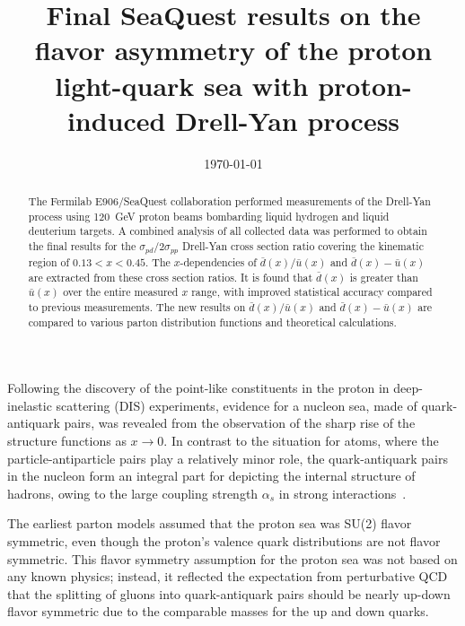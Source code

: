 \documentclass[reprint,aps,unsortedaddress,superscriptaddress,prl,floatfix,showpacs,linenumbers]{revtex4-2}
\begin{document}
\title{Final SeaQuest results on the flavor asymmetry of the proton light-quark sea with proton-induced Drell-Yan process}


\date{\today}

\begin{abstract}
    The Fermilab E906/SeaQuest collaboration performed measurements of the Drell-Yan process using
    \SI{120}{\GeV} proton beams bombarding liquid hydrogen and liquid deuterium targets.
    A combined analysis of all collected data was performed to obtain the final results for the $\sigma_{pd}/2\sigma_{pp}$ Drell-Yan cross
    section ratio covering the kinematic region of $0.13 < x < 0.45$.
    The $x$-dependencies of $\bar{d}\left(x\right) / \bar{u}\left(x\right)$ and $\bar{d}\left(x\right) - \bar{u}\left(x\right)$
    are extracted from these cross section ratios.
    It is found that $\bar{d}\left(x\right)$ is greater than $\bar{u}\left(x\right)$ over the entire measured $x$
    range, with improved statistical accuracy compared to previous measurements.
    The new results on $\bar{d}\left(x\right) / \bar{u}\left(x\right)$ and $\bar{d}\left(x\right) - \bar{u}\left(x\right)$
    are compared to various parton distribution functions and theoretical calculations.
\end{abstract}


\maketitle


Following the discovery of the point-like constituents in the proton in
deep-inelastic scattering (DIS) experiments, evidence for a nucleon sea,
made of quark-antiquark pairs,
was revealed from the observation of the sharp rise of the structure
functions as $x \to 0$. In contrast to the situation for atoms, where
the particle-antiparticle pairs play a relatively minor role, the
quark-antiquark pairs in the nucleon form an integral part for
depicting the internal structure of hadrons, owing to the large
coupling strength $\alpha_s$ in strong interactions~\cite{friedman1972}.

The earliest parton models assumed that the proton sea was SU(2)
flavor symmetric, even though the proton's valence quark
distributions are not flavor symmetric. This flavor symmetry assumption
for the proton sea was not based on any known physics; instead, it reflected the
expectation from perturbative QCD that the splitting of gluons
into quark-antiquark pairs should be nearly up-down flavor symmetric
due to the comparable masses for the up and down quarks.
\end{document}
